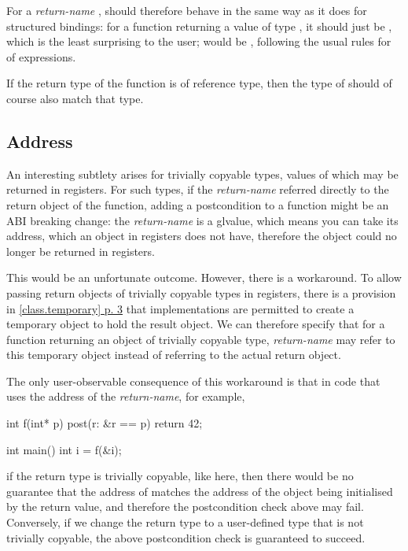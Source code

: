For a \emph{return-name} ,  should therefore behave in the same way as it does for structured bindings: for a function returning a value of type , it should just be , which is the least surprising to the user;  would be , following the usual rules for  of expressions.

If the return type of the function is of reference type, then the type of  should of course also match that type.

\subsection{Address}

An interesting subtlety arises for trivially copyable types, values of which may be returned in registers. For such types, if the \emph{return-name} referred directly to the return object of the function, adding a postcondition to a function might be an ABI breaking change: the \emph{return-name} is a glvalue, which means you can take its address, which an object in registers does not have, therefore the object could no longer be returned in registers.

This would be an unfortunate outcome. However, there is a workaround. To allow passing return objects of trivially copyable types in registers, there is a provision in \href{https://eel.is/c++draft/class.temporary#3}{[class.temporary] p. 3} that implementations are permitted to create a temporary object to hold the result object. We can therefore specify that for a function returning an object of trivially copyable type, \emph{return-name} may refer to this temporary object instead of referring to the actual return object.

The only user-observable consequence of this workaround is that in code that uses the address of the \emph{return-name}, for example,

\begin{codeblock}
int f(int* p)
  post(r: &r == p)
{
  return 42;
}

int main() {
  int i = f(&i);
}
\end{codeblock}

if the return type is trivially copyable, like  here, then there would be no guarantee that the address of  matches the address of the object being initialised by the return value, and therefore the postcondition check above may fail. Conversely, if we change the return type to a user-defined type that is not trivially copyable, the above postcondition check is guaranteed to succeed.


